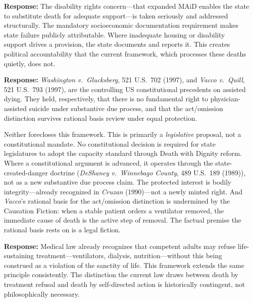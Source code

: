 \documentclass[11pt, letterpaper]{article}
\begin{document}
\medskip

\begin{objectionbox}[title={\sffamily\bfseries\small\color{C@warning}
  Objection 3: ``The disability community opposes this''}]
\textbf{Response:} The disability rights concern---that expanded MAiD enables the state
to substitute death for adequate support---is taken seriously and addressed structurally.
The mandatory socioeconomic documentation requirement makes state failure publicly
attributable. Where inadequate housing or disability support drives a provision, the
state documents and reports it. This creates political accountability that the current
framework, which processes these deaths quietly, does not.
\end{objectionbox}

\medskip

\begin{objectionbox}[title={\sffamily\bfseries\small\color{C@warning}
  Objection 5 (US): ``\textit{Glucksberg} forecloses the constitutional argument''}]
\textbf{Response:} \textit{Washington v.\ Glucksberg}, 521 U.S.\ 702 (1997), and
\textit{Vacco v.\ Quill}, 521 U.S.\ 793 (1997), are the controlling US constitutional
precedents on assisted dying. They held, respectively, that there is no fundamental
right to physician-assisted suicide under substantive due process, and that the
act/omission distinction survives rational basis review under equal protection.

Neither forecloses this framework. This is primarily a \textit{legislative} proposal,
not a constitutional mandate. No constitutional decision is required for state legislatures
to adopt the capacity standard through Death with Dignity reform. Where a constitutional
argument is advanced, it operates through the state-created-danger doctrine
(\textit{DeShaney v.\ Winnebago County}, 489 U.S.\ 189 (1989)), not as a new substantive
due process claim. The protected interest is bodily integrity---already recognized in
\textit{Cruzan} (1990)---not a newly minted right. And \textit{Vacco}'s rational basis
for the act/omission distinction is undermined by the Causation Fiction: when a stable
patient orders a ventilator removed, the immediate cause of death is the active step of
removal. The factual premise the rational basis rests on is a legal fiction.
\end{objectionbox}

\medskip

\begin{objectionbox}[title={\sffamily\bfseries\small\color{C@warning}
  Objection 4: ``It contradicts the sanctity of life''}]
\textbf{Response:} Medical law already recognizes that competent adults may refuse
life-sustaining treatment---ventilators, dialysis, nutrition---without this being
construed as a violation of the sanctity of life. This framework extends the same
principle consistently. The distinction the current law draws between death by treatment
refusal and death by self-directed action is historically contingent, not philosophically
necessary.
\end{objectionbox}
\end{document}
